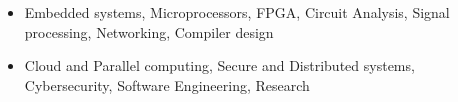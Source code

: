 \documentclass[11pt,a4paper,ragged2e]{altacv}
\begin{document}
\begin{paracol}{1}
\medskip

\begin{itemize} 
\item Embedded systems, Microprocessors, FPGA, Circuit Analysis, Signal processing, Networking,  Compiler design
\item Cloud and Parallel computing, Secure and Distributed systems, Cybersecurity, Software Engineering, Research
\end{itemize}




\medskip


\end{paracol}
\end{document}
